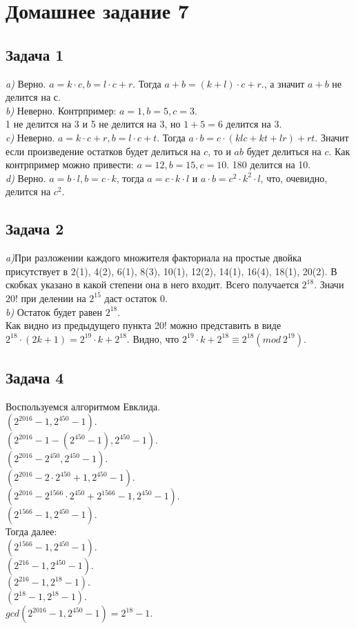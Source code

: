 

	\section{Домашнее задание 7} 
	\subsection{Задача 1} 
	\textit{a)} Верно. $a = k \cdot c, b = l \cdot c + r$. Тогда $a + b = (k+l) \cdot c + r.$, а значит $a + b$ не делится на $с$. \\
	\textit{b)} Неверно. Контрпример: $a = 1, b = 5, c = 3$.\\
	1 не делится на 3 и 5 не делится на 3, но $1 + 5 = 6$ делится на 3.\\
	\textit{c)} Неверно. $a = k \cdot c + r, b = l \cdot c + t$. Тогда $a \cdot b = c \cdot(klc + kt + lr) + rt$. Значит если произведение остатков будет делиться на $c$, то и $ab$ будет делиться на $c$. Как контрпример можно привести: $a = 12, b = 15, c = 10$. 180 делится на 10.\\
	\textit{d)} Верно. $a = b \cdot l, b = c \cdot k$, тогда $a = c \cdot k \cdot l$ и $a \cdot b = c^2 \cdot k^2 \cdot l$, что, очевидно, делится на $c^2$.
	
	\subsection{Задача 2} 
	\textit{a)}При разложении каждого множителя факториала на простые двойка присутствует в 2(1), 4(2), 6(1), 8(3), 10(1), 12(2), 14(1), 16(4), 18(1), 20(2). В скобках указано в какой степени она в него входит. Всего получается $2^{18}$. Значи $20!$ при делении на $2^{15}$ даст остаток 0.\\
	\textit{b)} Остаток будет равен $2^{18}$. \\ 
	Как видно из предыдущего пункта 20! можно представить в виде $2^{18} \cdot (2k+1) = 2^{19} \cdot k + 2^{18}$.
	Видно, что $2^{19} \cdot k + 2^{18} \equiv 2^{18}  (mod\ 2^{19})$.
	
	\subsection{Задача 4}
	Воспользуемся алгоритмом Евклида.\\
	$(2^{2016} - 1, 2^{450} - 1).$\\
	$(2^{2016} - 1 - (2^{450} - 1), 2^{450} - 1).$\\
	$(2^{2016} - 2^{450}, 2^{450} - 1).$\\
	$(2^{2016} - 2 \cdot 2^{450} + 1, 2^{450} - 1).$\\
	$(2^{2016} - 2^{1566} \cdot 2^{450} + 2^{1566} - 1, 2^{450} - 1).$\\
	$(2^{1566} - 1, 2^{450} - 1).$\\
	Тогда далее:\\
	$(2^{1566} - 1, 2^{450} - 1).$\\
	$(2^{216} - 1, 2^{450} - 1).$\\
	$(2^{216} - 1, 2^{18} - 1).$\\
	$(2^{18} - 1, 2^{18} - 1).$\\
	$gcd(2^{2016} - 1, 2^{450} - 1) = 2^{18} - 1$.
	

